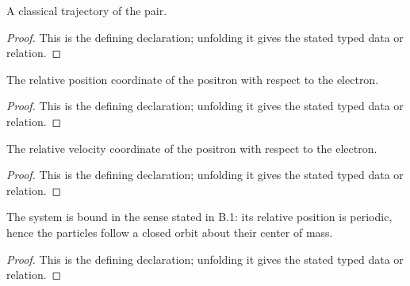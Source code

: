 \begin{definition}[ElectronPositronOrbit]
  \label{decl:physics:IPhO_2026_1_B_1:ElectronPositronOrbit}
  A classical trajectory of the pair.
\end{definition}
\begin{proof}
  This is the defining declaration; unfolding it gives the stated typed data or relation.
\end{proof}

\begin{definition}[relativePositionInSI]
  \label{decl:physics:IPhO_2026_1_B_1:relativePositionInSI}
  The relative position coordinate of the positron with respect to the electron.
\end{definition}
\begin{proof}
  This is the defining declaration; unfolding it gives the stated typed data or relation.
\end{proof}

\begin{definition}[relativeVelocityInSI]
  \label{decl:physics:IPhO_2026_1_B_1:relativeVelocityInSI}
  The relative velocity coordinate of the positron with respect to the electron.
\end{definition}
\begin{proof}
  This is the defining declaration; unfolding it gives the stated typed data or relation.
\end{proof}

\begin{definition}[IsBoundClosedOrbit]
  \label{decl:physics:IPhO_2026_1_B_1:IsBoundClosedOrbit}
  The system is bound in the sense stated in B.1: its relative position is periodic, hence the particles follow a closed orbit about their center of mass.
\end{definition}
\begin{proof}
  This is the defining declaration; unfolding it gives the stated typed data or relation.
\end{proof}

